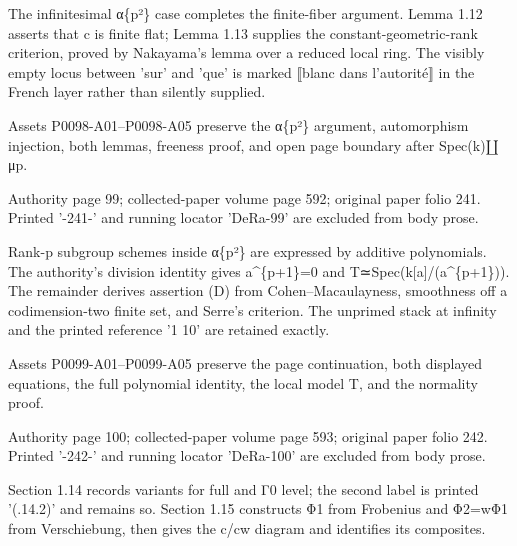 \documentclass[11pt,a4paper]{article}
\begin{document}
The infinitesimal α\textunderscore{}\{p²\} case completes the finite-fiber argument. Lemma 1.12 asserts that c is finite flat; Lemma 1.13 supplies the constant-geometric-rank criterion, proved by Nakayama's lemma over a reduced local ring. The visibly empty locus between 'sur' and 'que' is marked ⟦blanc dans l'autorité⟧ in the French layer rather than silently supplied.

Assets P0098-A01--P0098-A05 preserve the α\textunderscore{}\{p²\} argument, automorphism injection, both lemmas, freeness proof, and open page boundary after Spec(k)\ensuremath{\amalg}μ\textunderscore{}p.


\par\medskip
\hypertarget{D018-P0099}{}
\par\smallskip
Authority page 99; collected-paper volume page 592; original paper folio 241. Printed '-241-' and running locator 'DeRa-99' are excluded from body prose.

Rank-p subgroup schemes inside α\textunderscore{}\{p²\} are expressed by additive polynomials. The authority's division identity gives a\textasciicircum{}\{p+1\}=0 and T≃Spec(k[a]/(a\textasciicircum{}\{p+1\})). The remainder derives assertion (D) from Cohen--Macaulayness, smoothness off a codimension-two finite set, and Serre's criterion. The unprimed stack at infinity and the printed reference '1 10' are retained exactly.

Assets P0099-A01--P0099-A05 preserve the page continuation, both displayed equations, the full polynomial identity, the local model T, and the normality proof.


\par\medskip
\hypertarget{D018-P0100}{}
\par\smallskip
Authority page 100; collected-paper volume page 593; original paper folio 242. Printed '-242-' and running locator 'DeRa-100' are excluded from body prose.

Section 1.14 records variants for full and Γ\textunderscore{}0 level; the second label is printed '(.14.2)' and remains so. Section 1.15 constructs Φ\textunderscore{}1 from Frobenius and Φ\textunderscore{}2=wΦ\textunderscore{}1 from Verschiebung, then gives the c/cw diagram and identifies its composites.
\end{document}
